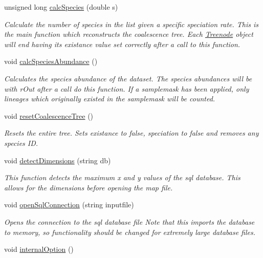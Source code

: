 \begin{DoxyCompactItemize}
unsigned long \hyperlink{class_treelist_a251b84151f3ba70e34bca3824b165093}{calc\+Species} (double s)
\begin{DoxyCompactList}\small\item\em Calculate the number of species in the list given a specific speciation rate. This is the main function which reconstructs the coalescence tree. Each \hyperlink{class_treenode}{Treenode} object will end having its existance value set correctly after a call to this function. \end{DoxyCompactList}\item 
void \hyperlink{class_treelist_a7d077eac323c32bfdce6bca808f357ae}{calc\+Species\+Abundance} ()\hypertarget{class_treelist_a7d077eac323c32bfdce6bca808f357ae}{}\label{class_treelist_a7d077eac323c32bfdce6bca808f357ae}

\begin{DoxyCompactList}\small\item\em Calculates the species abundance of the dataset. The species abundances will be with r\+Out after a call do this function. If a samplemask has been applied, only lineages which originally existed in the samplemask will be counted. \end{DoxyCompactList}\item 
void \hyperlink{class_treelist_ad089f6a63b1904d0b50299adfae52f5b}{reset\+CoalescenceTree} ()\hypertarget{class_treelist_ad089f6a63b1904d0b50299adfae52f5b}{}\label{class_treelist_ad089f6a63b1904d0b50299adfae52f5b}

\begin{DoxyCompactList}\small\item\em Resets the entire tree. Sets existance to false, speciation to false and removes any species ID. \end{DoxyCompactList}\item 
void \hyperlink{class_treelist_acaa619f2d186f60c9c9fa5d90db0da68}{detect\+Dimensions} (string db)
\begin{DoxyCompactList}\small\item\em This function detects the maximum x and y values of the sql database. This allows for the dimensions before opening the map file. \end{DoxyCompactList}\item 
void \hyperlink{class_treelist_aa0a68f38a0cfcfe69d53dd8387174688}{open\+Sql\+Connection} (string inputfile)
\begin{DoxyCompactList}\small\item\em Opens the connection to the sql database file Note that this imports the database to memory, so functionality should be changed for extremely large database files. \end{DoxyCompactList}\item 
void \hyperlink{class_treelist_a98bd7ebad85966794a3871969b0f04f8}{internal\+Option} ()\hypertarget{class_treelist_a98bd7ebad85966794a3871969b0f04f8}{}\label{class_treelist_a98bd7ebad85966794a3871969b0f04f8}


\end{DoxyCompactItemize}
